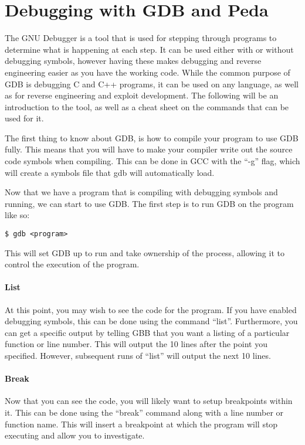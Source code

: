 	\section{Debugging with GDB and Peda}
		The GNU Debugger is a tool that is used for stepping through programs to determine what is happening at each step. 
		It can be used either with or without debugging symbols, 
		however having these makes debugging and reverse engineering easier as you have the working code. 
		While the common purpose of GDB is debugging C and C++ programs, it can be used on any language, as well as for reverse engineering and exploit development. 
		The following will be an introduction to the tool, as well as a cheat sheet on the commands that can be used for it. 
			
		The first thing to know about GDB, is how to compile your program to use GDB fully. 
		This means that you will have to make your compiler write out the source code symbols when compiling. 
		This can be done in GCC with the ``-g'' flag, which will create a symbols file that gdb will automatically load. 

		Now that we have a program that is compiling with debugging symbols and running, we can start to use GDB. 
		The first step is to run GDB on the program like so:
		\begin{lstlisting}[style=CLI]
			$ gdb <program>
		\end{lstlisting}
		This will set GDB up to run and take ownership of the process, allowing it to control the execution of the program. 

		\paragraph{List}
		At this point, you may wish to see the code for the program. 
		If you have enabled debugging symbols, this can be done using the command ``list''. 
		Furthermore, you can get a specific output by telling GBB that you want a listing of a particular function or line number. 
		This will output the 10 lines after the point you specified. 
		However, subsequent runs of ``list'' will output the next 10 lines. 

		\paragraph{Break}
		Now that you can see the code, you will likely want to setup breakpoints within it. 
		This can be done using the ``break'' command along with a line number or function name. 
		This will insert a breakpoint at which the program will stop executing and allow you to investigate. 
			
